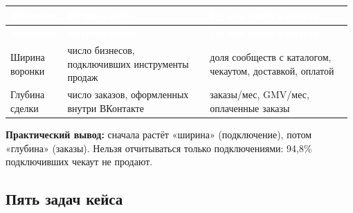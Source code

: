 \documentclass[10pt,a4paper]{article}
\begin{document}
\begingroup
\small
\setlength{\tabcolsep}{3pt}
\renewcommand{\arraystretch}{1.12}
\begin{longtable}{@{}>{\raggedright\arraybackslash}p{0.1288\linewidth}>{\raggedright\arraybackslash}p{0.4233\linewidth}>{\raggedright\arraybackslash}p{0.4233\linewidth}@{}}
\rowcolor{blue}
\textcolor{white}{\textbf{Измерение}} & \textcolor{white}{\textbf{Метрика кейса}} & \textcolor{white}{\textbf{Где она живёт в модели}} \\
\endfirsthead
\rowcolor{blue}
\textcolor{white}{\textbf{Измерение}} & \textcolor{white}{\textbf{Метрика кейса}} & \textcolor{white}{\textbf{Где она живёт в модели}} \\
\endhead
\hline
Ширина воронки & число бизнесов, подключивших инструменты продаж & доля сообществ с каталогом, чекаутом, доставкой, оплатой \\
Глубина сделки & число заказов, оформленных внутри ВКонтакте & заказы/мес, GMV/мес, оплаченные заказы \\
\hline
\end{longtable}
\endgroup
\vspace{4pt}

\textbf{Практический вывод:} сначала растёт «ширина» (подключение), потом «глубина» (заказы). Нельзя отчитываться только подключениями: 94,8\% подключивших чекаут не продают.\par

\subsection{Пять задач кейса}
\end{document}
